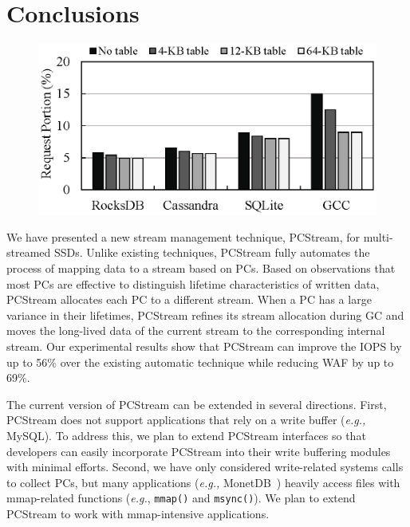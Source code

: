 \vspace{-10pt}
\section{Conclusions}
\vspace{-5pt}

\begin{figure}[t]
	\centering
	\includegraphics[width=0.7\linewidth]{figure/pctable}
	\caption{}
	\label{fig:pctable}
	\vspace{-10pt}
\end{figure}


We have presented a new stream management technique, \textsf{\small PCStream},
for multi-streamed SSDs.  Unlike existing techniques, \textsf{\small PCStream}
fully automates the process of mapping data to a stream based on PCs.  Based on
observations that most PCs are effective to distinguish lifetime
characteristics of written data, \textsf{\small PCStream} allocates each PC to
a different stream.  When a PC has a large variance in their lifetimes,
\textsf{\small PCStream} refines its stream allocation during GC and moves the
long-lived data of the current stream to the corresponding internal stream.
Our experimental results show that \textsf{\small PCStream} can improve the
IOPS by up to 56\% over the existing automatic technique while reducing WAF by
up to 69\%. 

The current version of \textsf{\small PCStream} can be extended in several
directions.  First, \textsf{\small PCStream} does not support applications that
rely on a write buffer ({\it e.g.,} MySQL). To address this, we plan to extend
\textsf{\small PCStream} interfaces so that developers can easily incorporate
\textsf{\small PCStream} into their write buffering modules with minimal
efforts.  Second, we have only considered write-related systems calls to
collect PCs, but many applications ({\it e.g.,} MonetDB~\cite{MonetDB}) heavily
access files with mmap-related functions ({\it e.g.}, \texttt{mmap()} and
\texttt{msync()}).  We plan to extend \textsf{\small PCStream} to work with
mmap-intensive applications. 

